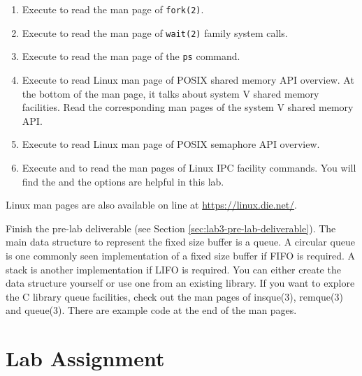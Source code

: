 \begin{enumerate}
\item Execute  to read the man page of \verb+fork(2)+.
\item Execute  to read the man page of \verb+wait(2)+ family system calls.
\item Execute  to read the man page of the \verb+ps+ command.
\item Execute  to read Linux man page of POSIX shared memory API overview. At the bottom of the man page, it talks about system V shared memory facilities. Read the corresponding man pages of the system V shared memory API.
\item Execute  to read Linux man page of POSIX semaphore API overview.
\item Execute  and  to read the man pages of Linux IPC facility commands. You will find the  and the  options are helpful in this lab.  
\end{enumerate}
Linux man pages are also available on line at \url{https://linux.die.net/}.

Finish the pre-lab deliverable (see Section \ref{sec:lab3-pre-lab-deliverable}).
The main data structure to represent the fixed size buffer is a queue. A circular queue is one commonly seen implementation of a fixed size buffer if FIFO is required. A stack is another implementation if LIFO is required. You can either create the data structure yourself or use one from an existing library. If you want to explore the C library queue facilities, check out the man pages of insque(3), remque(3) and queue(3). There are example code at the end of the man pages.

\section{Lab Assignment}

